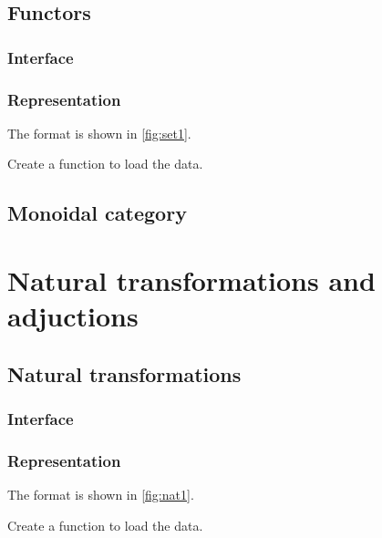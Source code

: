 \section{Functors}

\subsection*{Interface}

\subsection*{Representation}
The format is shown in \cref{fig:set1}.




\begin{exercise}
  Create a function to load the data.
%
\end{exercise}


\section{Monoidal category}


\chapter{Natural transformations and adjuctions}


\section{Natural transformations}

\subsection*{Interface}

\subsection*{Representation}
The format is shown in \cref{fig:nat1}.



\begin{exercise}
  Create a function to load the data.

%
\end{exercise}


